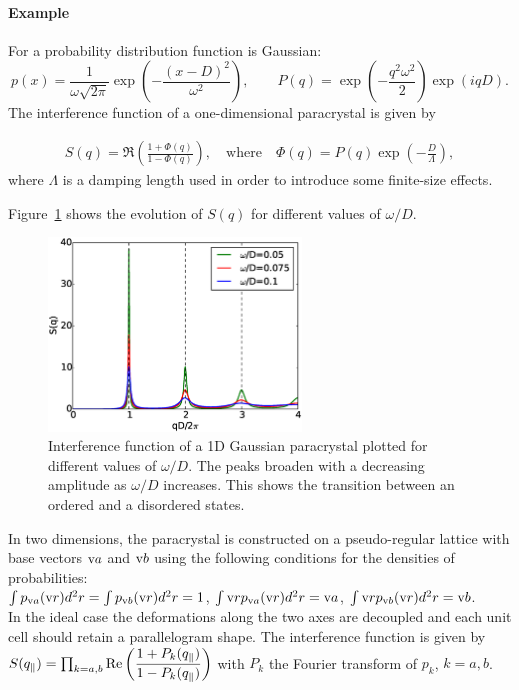 \paragraph{Example} For a probability distribution function is Gaussian:
\begin{equation*}
p(x)=\frac{1}{\omega \sqrt{2\pi}} \exp\left(-\dfrac{(x-D)^2}{\omega^2}\right),\qquad P(q)=\exp\left(-\frac{q^2 \omega^2}{2}\right)\exp(iqD).
\end{equation*}
 The interference function of a one-dimensional paracrystal is given by

\begin{align*}
S(q) =\Re \left(\frac{1+\Phi(q) }{1 - \Phi(q)} \right), \quad \mathrm{where}\quad \Phi(q) = P(q)\exp\left(-\frac{D}{\Lambda}\right),
\end{align*}
where $\Lambda$ is a damping length used in order to introduce some finite-size effects.

Figure~\ref{fig:1dparas_q} shows the evolution of $S(q)$ for different values of $\omega /D$.

\begin{figure}[tb]
\begin{center}
\includegraphics[width=0.6\textwidth]{fig/funcplot/S_q_1Dparacrystal.eps}
\end{center}
\caption{Interference function of a 1D Gaussian paracrystal plotted for different values of $\omega /D$. The peaks broaden with a decreasing amplitude as $\omega/D$ increases. This shows the transition between an ordered and a disordered states. }
\label{fig:1dparas_q}
\end{figure}

In two dimensions, the paracrystal is constructed on a pseudo-regular lattice with base vectors $\text{v}{a}$ and $\text{v}{b}$ using the following conditions for the densities of probabilities:\\ $\int p_{\text{v}{a}}(\text{v}{r})d^2r=\int p_{\text{v}{b}}(\text{v}{r})d^2r=1$, $\int \text{v}{r} p_{\text{v}{a}}(\text{v}{r})d^2r=\text{v}{a}$, $\int \text{v}{r} p_{\text{v}{b}}(\text{v}{r})d^2r=\text{v}{b}$.\\
In the ideal case the deformations along the two axes are decoupled and each unit cell should retain a parallelogram shape. The interference function is given by\\ $S(q_{\parallel})=\prod_{k=a,b}\operatorname{Re}\left(\dfrac{1+P_k(q_{\parallel})}{1-P_k(q_{\parallel})} \right)$ with $P_k$ the Fourier transform of $p_k$, $k=a, b$.

